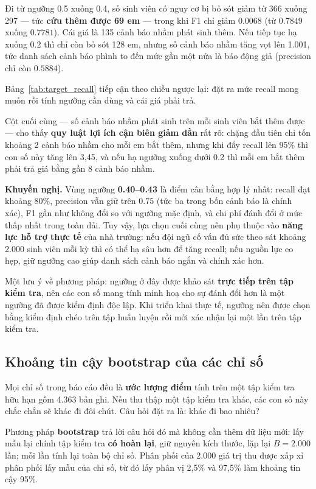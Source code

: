 \documentclass[a4paper]{article}
\begin{document}
Đi từ ngưỡng 0.5 xuống 0.4, số sinh viên có nguy cơ bị bỏ sót giảm từ 366
xuống 297 --- tức \textbf{cứu thêm được 69 em} --- trong khi F1 chỉ giảm
$0.0068$ (từ $0.7849$ xuống $0.7781$). Cái giá là 135 cảnh báo nhầm phát sinh
thêm. Nếu tiếp tục hạ xuống 0.2 thì chỉ còn bỏ sót 128 em, nhưng số cảnh báo
nhầm tăng vọt lên 1.001, tức danh sách cảnh báo phình to đến mức gần một nửa
là báo động giả (precision chỉ còn $0.5884$).

Bảng~\ref{tab:target_recall} tiếp cận theo chiều ngược lại: đặt ra mức recall
mong muốn rồi tính ngưỡng cần dùng và cái giá phải trả.



Cột cuối cùng --- số cảnh báo nhầm phát sinh trên mỗi sinh viên bắt thêm được
--- cho thấy \textbf{quy luật lợi ích cận biên giảm dần} rất rõ: chặng đầu tiên
chỉ tốn khoảng 2 cảnh báo nhầm cho mỗi em bắt thêm, nhưng khi đẩy recall lên
95\% thì con số này tăng lên 3{,}45, và nếu hạ ngưỡng xuống dưới 0.2 thì mỗi
em bắt thêm phải trả giá bằng gần 8 cảnh báo nhầm.

\textbf{Khuyến nghị.} Vùng ngưỡng \textbf{0.40--0.43} là điểm cân bằng hợp lý
nhất: recall đạt khoảng 80\%, precision vẫn giữ trên $0.75$ (tức ba trong bốn
cảnh báo là chính xác), F1 gần như không đổi so với ngưỡng mặc định, và chi phí
đánh đổi ở mức thấp nhất trong toàn dải. Tuy vậy, lựa chọn cuối cùng nên phụ
thuộc vào \textbf{năng lực hỗ trợ thực tế} của nhà trường: nếu đội ngũ cố vấn
đủ sức theo sát khoảng 2.000 sinh viên mỗi kỳ thì có thể hạ sâu hơn để tăng
recall; nếu nguồn lực eo hẹp, giữ ngưỡng cao giúp danh sách cảnh báo ngắn và
chính xác hơn.

Một lưu ý về phương pháp: ngưỡng ở đây được khảo sát \textbf{trực tiếp trên tập
kiểm tra}, nên các con số mang tính minh hoạ cho sự đánh đổi hơn là một ngưỡng
đã được kiểm định độc lập. Khi triển khai thực tế, ngưỡng nên được chọn bằng
kiểm định chéo trên tập huấn luyện rồi mới xác nhận lại một lần trên tập kiểm
tra.

\subsection{Khoảng tin cậy bootstrap của các chỉ số}

Mọi chỉ số trong báo cáo đều là \textbf{ước lượng điểm} tính trên một tập kiểm
tra hữu hạn gồm 4.363 bản ghi. Nếu thu thập một tập kiểm tra khác, các con số
này chắc chắn sẽ khác đi đôi chút. Câu hỏi đặt ra là: khác đi bao nhiêu?

Phương pháp \textbf{bootstrap} trả lời câu hỏi đó mà không cần thêm dữ liệu
mới: lấy mẫu lại chính tập kiểm tra \textbf{có hoàn lại}, giữ nguyên kích
thước, lặp lại $B = 2.000$ lần; mỗi lần tính lại toàn bộ chỉ số. Phân phối của
2.000 giá trị thu được xấp xỉ phân phối lấy mẫu của chỉ số, từ đó lấy phân vị
2{,}5\% và 97{,}5\% làm khoảng tin cậy 95\%.
\end{document}
